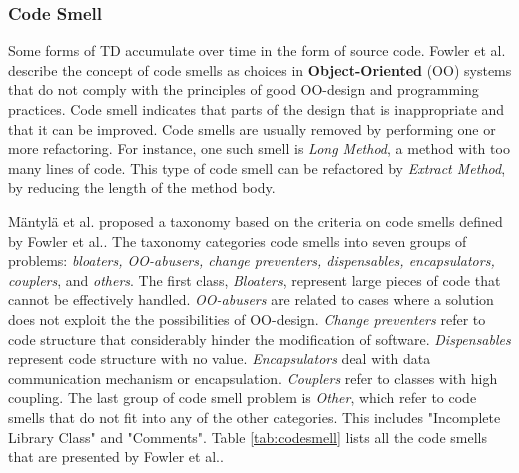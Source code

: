 \subsubsection{Code Smell}
\label{subsub:codesmell}
Some forms of TD accumulate over time in the form of source code\cite{zazworka2014comparing}. Fowler et al.\cite{fowler1999refactoring} describe the concept of code smells as choices in \textbf{Object-Oriented} (OO) systems that do not comply with the principles of good OO-design and programming practices. Code smell indicates that parts of the design that is inappropriate and that it can be improved. Code smells are usually removed by performing one or more refactoring\cite{fowler1999refactoring}. For instance, one such smell is \textit{Long Method}, a method with too many lines of code. This type of code smell can be refactored by \textit{Extract Method}, by reducing the length of the method body\cite{fowler1999refactoring}. 

Mäntylä et al.\cite{mantyla2003taxonomy} proposed a taxonomy based on the criteria on code smells defined by Fowler et al.\cite{fowler1999refactoring}. The taxonomy categories code smells into seven groups of problems: \textit{bloaters, OO-abusers, change preventers, dispensables, encapsulators, couplers}, and \textit{others}. The first class, \textit{Bloaters}, represent large pieces of code that cannot be effectively handled. \textit{OO-abusers} are related to cases where a solution does not exploit the the possibilities of OO-design. \textit{Change preventers} refer to code structure that considerably hinder the modification of software. \textit{Dispensables} represent code structure with no value. \textit{Encapsulators} deal with data communication mechanism or encapsulation. \textit{Couplers} refer to classes with high coupling. The last group of code smell problem is \textit{Other}, which refer to code smells that do not fit into any of the other categories. This includes "Incomplete Library Class" and "Comments". Table \ref{tab:codesmell} lists all the code smells that are presented by Fowler et al.\cite{fowler1999refactoring}.



